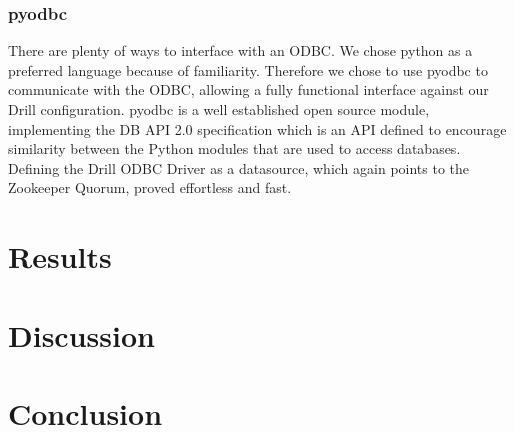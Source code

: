 \documentclass[a4paper,english]{report}
\begin{document}
			\subsection{pyodbc}
				There are plenty of ways to interface with an ODBC. We chose python as a preferred language because of familiarity. Therefore we chose to use pyodbc\cite{pyodbc} to communicate with the ODBC, allowing a fully functional interface against our Drill configuration. pyodbc is a well established open source module, implementing the DB API 2.0 specification which is an API defined to encourage similarity between the Python modules that are used to access databases. Defining the Drill ODBC Driver as a datasource, which again points to the Zookeeper Quorum, proved effortless and fast.
	
	
	\chapter{Results}
	
	
	\chapter{Discussion}
	
	
	\chapter{Conclusion}
	
\end{document}
